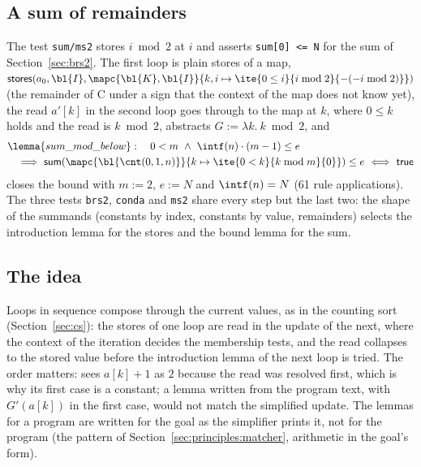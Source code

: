 \subsection{A sum of remainders}\label{sec:ms2}
The test \texttt{sum/ms2} stores $i \bmod 2$ at $i$ and asserts \texttt{sum[0] <= N} for the sum of
Section~\ref{sec:brs2}. The first loop is plain stores of a map, $\mathsf{stores}(a_0, \bl{I}, \mapc{\bl{K}, \bl{I}}{k, i \mapsto \ite{0 \le i}{i \bmod 2}{-(-i \bmod 2)}})$
(the remainder of C under a sign that the context of the map does not know yet), the read $a'[k]$ in the
second loop goes through  to the map at $k$, where $0 \le k$ holds and the read is
$k \bmod 2$,  abstracts $G := \lambda k.\ k \bmod 2$, and
\begin{align*}
  &\lemma{sum\_mod\_below}:\quad 0 < m\ \wedge\ \intf(n) \cdot (m - 1) \le e\\
  &\quad\Longrightarrow\ \mathsf{sum}(\mapc{\bl{\cnt(0, 1, n)}}{k \mapsto \ite{0 < k}{k \bmod m}{0}}) \le e\ \Longleftrightarrow\ \mathsf{true}
\end{align*}
closes the bound with $m := 2$, $e := N$ and $\intf(n) = N$ (61 rule applications). The three tests
\texttt{brs2}, \texttt{conda} and \texttt{ms2} share every step but the last two: the shape of the summands
(constants by index, constants by value, remainders) selects the introduction lemma for the stores and the
bound lemma for the sum.

\subsection{The idea}
Loops in sequence compose through the current values, as in the counting sort (Section~\ref{sec:cs}): the
stores of one loop are read in the update of the next, where the context of the iteration decides the
membership tests, and the read collapses to the stored value before the introduction lemma of the next loop
is tried. The order matters:  sees $a[k] + 1$ as $2$ because the read was resolved
first, which is why its first case is a constant; a lemma written from the program text, with $G'(a[k])$ in
the first case, would not match the simplified update. The lemmas for a program are written for the goal as
the simplifier prints it, not for the program (the pattern of Section~\ref{sec:principles:matcher}, arithmetic
in the goal's form).
